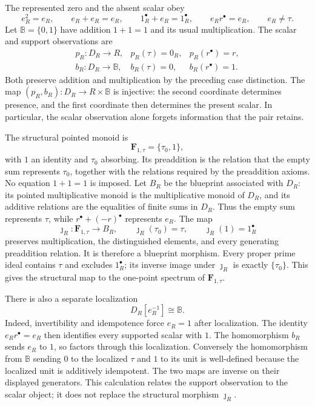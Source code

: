 The represented zero and the absent scalar obey
\[
e_R^2=e_R,\qquad e_R+e_R=e_R,\qquad
1_R^\bullet+e_R=1_R^\bullet,\qquad
e_Rr^\bullet=e_R,\qquad e_R\ne\tau.
\]
Let \(\mathbb B=\{0,1\}\) have addition \(1+1=1\) and its usual
multiplication. The scalar and support observations are
\[
\begin{array}{lll}
p_R:D_R\longrightarrow R,&p_R(\tau)=0_R,&p_R(r^\bullet)=r,\\
b_R:D_R\longrightarrow\mathbb B,&b_R(\tau)=0,&b_R(r^\bullet)=1.
\end{array}
\]
Both preserve addition and multiplication by the preceding case
distinction. The map \((p_R,b_R):D_R\to R\times\mathbb B\) is injective:
the second coordinate determines presence, and the first coordinate
then determines the present scalar. In particular, the scalar observation
alone forgets information that the pair retains.

The structural pointed monoid is
\[
\mathbf F_{1,\tau}=\{\tau_0,1\},
\]
with \(1\) an identity and \(\tau_0\) absorbing. Its preaddition is the
relation that the empty sum represents \(\tau_0\), together with the
relations required by the preaddition axioms. No equation
\(1+1=1\) is imposed. Let \(B_R\) be the blueprint associated with
\(D_R\): its pointed multiplicative monoid is the multiplicative monoid of \(D_R\),
and its additive relations are the equalities of finite sums in \(D_R\).
Thus the empty sum represents \(\tau\), while
\(r^\bullet+(-r)^\bullet\) represents \(e_R\).
The map
\[
\jmath_R:\mathbf F_{1,\tau}\longrightarrow B_R,\qquad
\jmath_R(\tau_0)=\tau,\qquad \jmath_R(1)=1_R^\bullet
\]
preserves multiplication, the distinguished elements, and every
generating preaddition relation. It is therefore a blueprint morphism.
Every proper prime ideal contains \(\tau\) and excludes
\(1_R^\bullet\); its inverse image under \(\jmath_R\) is exactly
\(\{\tau_0\}\). This gives the structural map to the one-point
spectrum of \(\mathbf F_{1,\tau}\).

There is also a separate localization
\[
D_R[e_R^{-1}]\cong\mathbb B.
\]
Indeed, invertibility and idempotence force \(e_R=1\) after localization.
The identity \(e_Rr^\bullet=e_R\) then identifies every supported scalar
with \(1\). The homomorphism \(b_R\) sends \(e_R\) to \(1\), so factors
through this localization. Conversely the homomorphism from
\(\mathbb B\) sending \(0\) to the localized \(\tau\) and \(1\) to its
unit is well-defined because the localized unit is additively
idempotent. The two maps are inverse on their displayed generators.
This calculation relates the support observation to the scalar object;
it does not replace the structural morphism \(\jmath_R\).

